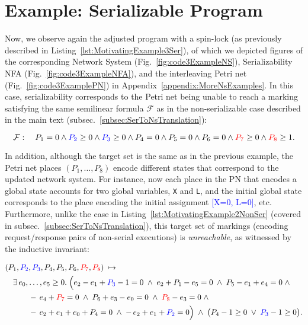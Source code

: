 
\section{Example: Serializable Program}
\label{appendix:ns-serializable}


Now, we observe again the adjusted program with a spin-lock (as previously described in Listing~\ref{lst:MotivatingExample3Ser}), of which we depicted figures of the corresponding Network System (Fig.~\ref{fig:code3ExampleNS}), Serializability NFA (Fig.~\ref{fig:code3ExampleNFA}), and the interleaving Petri net (Fig.~\ref{fig:code3ExamplePN}) in Appendix~\ref{appendix:MoreNsExamples}.
%
In this case, serializability corresponds to the Petri net being unable to reach a marking satisfying the same semilinear formula \(\mathcal {F}\) as in the non-serializable case described in the main text (subsec.~\ref{subsec:SerToNsTranslation}):

\[
\mathcal {F}:
\quad
P_1 = 0 \wedge 
\textcolor{blue}{P_2} \ge 0 \wedge \textcolor{blue}{P_3} \ge 0  \wedge P_4 = 0
\wedge P_5 = 0 \wedge P_6 = 0 \wedge \textcolor{red}{P_7} \ge 0 \wedge \textcolor{red}{P_8} \ge 1.
\]

%


In addition, although the target set is the same as in the previous example, the Petri net places $(P_1,\ldots,P_8)$ encode different states that correspond to the updated network system. For instance, now each place in the PN that encodes a global state accounts for two global variables, \texttt{X} and \texttt{L}, and the initial global state corresponds to the place encoding the initial assignment \textcolor{blue}{[X=0, L=0]}, etc.
%
Furthermore, unlike the case in Listing~\ref{lst:MotivatingExample2NonSer} (covered in subsec.~\ref{subsec:SerToNsTranslation}), this target set of markings (encoding request/response pairs of non-serial executions) is \textit{unreachable}, as witnessed by the inductive invariant:


\[
\begin{aligned}
	&(P_{1},\textcolor{blue}{P_{2}},\textcolor{blue}{P_{3}},P_{4},P_{5},P_{6},\textcolor{red}{P_{7}},\textcolor{red}{P_{8}})
	\;\mapsto\;\\
	&\quad
	\exists\,e_{0},\dots,e_{5}\ge0.\;
	\Bigl(
	e_{2}-e_{1}+\textcolor{blue}{P_{3}}-1=0\;\land\;
	e_{2}+P_{1}-e_{5}=0\;\land\;
	P_{5}-e_{1}+e_{4}=0\;\land\\
	&\qquad\quad
	-\,e_{4}+\textcolor{red}{P_{7}}=0\;\land\;
	P_{6}+e_{3}-e_{0}=0\;\land\;
	\textcolor{red}{P_{8}}-e_{3}=0\;\land\\
	&\qquad\quad
	-\,e_{2}+e_{1}+e_{0}+P_{4}=0\;\land\;
	-\,e_{2}+e_{1}+\textcolor{blue}{P_{2}}=0
	\Bigr)
	\;\land\;
	\bigl(P_{4}-1\ge0\;\lor\;\textcolor{blue}{P_{3}}-1\ge0\bigr).
\end{aligned}
\]



